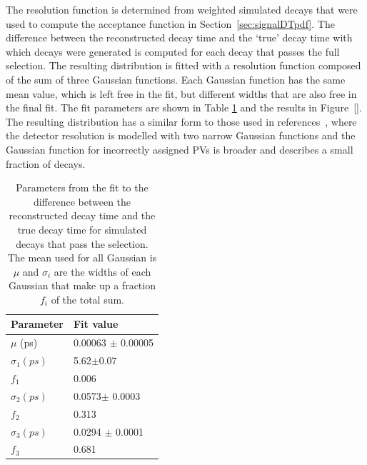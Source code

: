The resolution function is determined from weighted simulated \bsmumu decays that were used to compute the acceptance function in Section~\ref{sec:signalDTpdf}. The difference between the reconstructed decay time and the `true' decay time with which decays were generated is computed for each decay that passes the full selection. The resulting distribution is fitted with a resolution function composed of the sum of three Gaussian functions. Each Gaussian function has the same mean value, which is left free in the fit, but different widths that are also free in the final fit. The fit parameters are shown in Table \ref{tab:resolutionfit} and the results in Figure~\ref{}. %
The resulting distribution has a similar form to those used in references~\cite{Aaij:2016ohx,Aaij:2015vza}, where the detector resolution is modelled with two narrow Gaussian functions and the Gaussian function for incorrectly assigned PVs is broader and describes a small fraction of decays.


\begin{table}[ht]
\begin{center}
\begin{tabular}{|l|l|}
\hline
Parameter               & Fit value             \\ \hline
$\mu$ (ps)              & 0.00063 $\pm$ 0.00005 \\ \hline
$\sigma_{1} (ps)$       & 5.62$\pm$0.07         \\ 
$f_{1}$                 & 0.006               \\ \hline
$\sigma_{2} (ps)$       & 0.0573$\pm$ 0.0003    \\ 
$f_{2}$                 & 0.313                \\ \hline
$\sigma_{3} (ps)$       & 0.0294 $\pm$ 0.0001   \\ 
$f_{3}$                 & 0.681                \\ \hline
\end{tabular}
\vspace{0.7cm}                                                                                    
\caption{Parameters from the fit to the difference between the reconstructed decay time and the true decay time for simulated decays that pass the \bsmumu \el selection. The mean used for all Gaussian is $\mu$ and $\sigma_{i}$ are the widths of each Gaussian that make up a fraction $f_{i}$ of the total sum.}
\label{tab:resolutionfit}
\end{center}
\vspace{-1.0cm}                                                                                   
\end{table}

